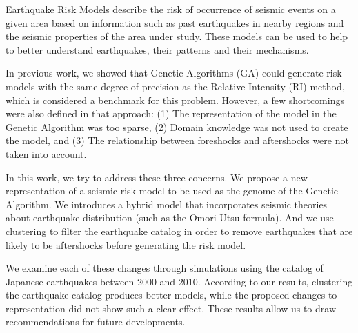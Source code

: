 Earthquake Risk Models describe the risk of occurrence of seismic
events on a given area based on information such as past earthquakes
in nearby regions and the seismic properties of the area under study.
These models can be used to help to better understand earthquakes,
their patterns and their mechanisms.

In previous work, we showed that Genetic Algorithms (GA) could
generate risk models with the same degree of precision as the Relative
Intensity (RI) method, which is considered a benchmark for this
problem.  However, a few shortcomings were also defined in that
approach: (1) The representation of the model in the Genetic Algorithm
was too sparse, (2) Domain knowledge was not used to create the model,
and (3) The relationship between foreshocks and aftershocks were not 
taken into account.

In this work, we try to address these three concerns. We propose a new
representation of a seismic risk model to be used as the genome of the
Genetic Algorithm. We introduces a hybrid model that incorporates
seismic theories about earthquake distribution (such as the Omori-Utsu
formula). And we use clustering to filter the earthquake catalog in
order to remove earthquakes that are likely to be aftershocks before
generating the risk model.

We examine each of these changes through simulations using the catalog
of Japanese earthquakes between 2000 and 2010. According to our
results, clustering the earthquake catalog produces better models,
while the proposed changes to representation did not show such a clear
effect. These results allow us to draw recommendations for future
developments.
